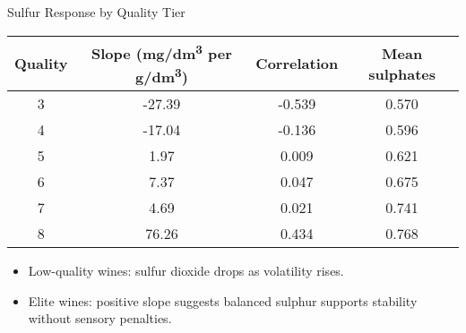\documentclass[aspectratio=169]{beamer}
\begin{document}
\begin{frame}{Sulfur Response by Quality Tier}
  \scriptsize
  \begin{tabular}{cS[table-format=3.2]S[table-format=1.3]S[table-format=1.3]}
    \toprule
    \textbf{Quality} & {Slope (mg/dm\textsuperscript{3} per g/dm\textsuperscript{3})} & {Correlation} & {Mean sulphates} \\
     & -27.39 & -0.539 & 0.570 \\
    4 & -17.04 & -0.136 & 0.596 \\
    5 & 1.97 & 0.009 & 0.621 \\
    6 & 7.37 & 0.047 & 0.675 \\
    7 & 4.69 & 0.021 & 0.741 \\
    8 & 76.26 & 0.434 & 0.768 \\
    \bottomrule
  \end{tabular}
  \vspace{0.75em}
  \begin{itemize}
    \item Low-quality wines: sulfur dioxide drops as volatility rises.
    \item Elite wines: positive slope suggests balanced sulphur supports stability without sensory penalties.
  \end{itemize}
\end{frame}

\end{document}
